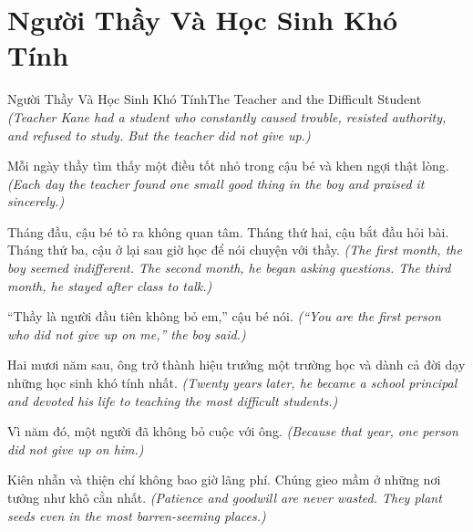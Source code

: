 \section{Người Thầy Và Học Sinh Khó Tính}
\begin{truyen}{Người Thầy Và Học Sinh Khó Tính}{The Teacher and the Difficult Student}
\textit{(Teacher Kane had a student who constantly caused trouble, resisted authority, and refused to study. But the teacher did not give up.)}

Mỗi ngày thầy tìm thấy một điều tốt nhỏ trong cậu bé và khen ngợi thật lòng.
\textit{(Each day the teacher found one small good thing in the boy and praised it sincerely.)}

Tháng đầu, cậu bé tỏ ra không quan tâm. Tháng thứ hai, cậu bắt đầu hỏi bài. Tháng thứ ba, cậu ở lại sau giờ học để nói chuyện với thầy.
\textit{(The first month, the boy seemed indifferent. The second month, he began asking questions. The third month, he stayed after class to talk.)}

``Thầy là người đầu tiên không bỏ em,'' cậu bé nói.
\textit{(``You are the first person who did not give up on me,'' the boy said.)}

Hai mươi năm sau, ông trở thành hiệu trưởng một trường học và dành cả đời dạy những học sinh khó tính nhất.
\textit{(Twenty years later, he became a school principal and devoted his life to teaching the most difficult students.)}

Vì năm đó, một người đã không bỏ cuộc với ông.
\textit{(Because that year, one person did not give up on him.)}

\end{truyen}

\begin{baihoc}
Kiên nhẫn và thiện chí không bao giờ lãng phí. Chúng gieo mầm ở những nơi tưởng như khô cằn nhất.
\textit{(Patience and goodwill are never wasted. They plant seeds even in the most barren-seeming places.)}
\end{baihoc}
